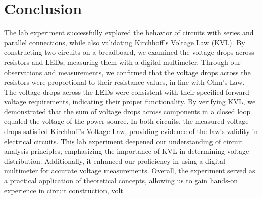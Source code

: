 \documentclass{report}
\begin{document}
\section{Conclusion}
The lab experiment successfully explored the behavior of circuits with series and
parallel connections, while also validating Kirchhoff's Voltage Law (KVL). By
constructing two circuits on a breadboard, we examined the voltage drops across
resistors and LEDs, measuring them with a digital multimeter.
Through our observations and measurements, we confirmed that the voltage drops
across the resistors were proportional to their resistance values, in line with Ohm's
Law. The voltage drops across the LEDs were consistent with their specified
forward voltage requirements, indicating their proper functionality.
By verifying KVL, we demonstrated that the sum of voltage drops across
components in a closed loop equaled the voltage of the power source. In both
circuits, the measured voltage drops satisfied Kirchhoff's Voltage Law, providing
evidence of the law's validity in electrical circuits.
This lab experiment deepened our understanding of circuit analysis principles,
emphasizing the importance of KVL in determining voltage distribution.
Additionally, it enhanced our proficiency in using a digital multimeter for accurate
voltage measurements.
Overall, the experiment served as a practical application of theoretical concepts,
allowing us to gain hands-on experience in circuit construction, volt
\end{document}
